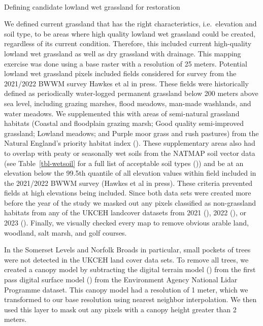 \documentclass[
  12pt,
  letterpaper,
  DIV=11,
  numbers=noendperiod]{scrartcl}
\makeatletter
\let\oldparagraph\paragraph
\renewcommand{\paragraph}{
    \@ifstar
      \xxxParagraphStar
      \xxxParagraphNoStar
  }
\newcommand{\xxxParagraphStar}[1]{\oldparagraph*{#1}\mbox{}}
\newcommand{\xxxParagraphNoStar}[1]{\oldparagraph{#1}\mbox{}}
\makeatother
\begin{document}
\paragraph{Defining candidate lowland wet grassland for
restoration}\label{defining-candidate-lowland-wet-grassland-for-restoration}

We defined current grassland that has the right characteristics,
i.e.~elevation and soil type, to be areas where high quality lowland wet
grassland could be created, regardless of its current condition.
Therefore, this included current high-quality lowland wet grassland as
well as dry grassland with drainage. This mapping exercise was done
using a base raster with a resolution of 25 meters. Potential lowland
wet grassland pixels included fields considered for survey from the
2021/2022 BWWM survey Hawkes et al in press. These fields were
historically defined as periodically water-logged permanent grassland
below 200 meters above sea level, including grazing marshes, flood
meadows, man-made washlands, and water meadows. We supplemented this
with areas of semi-natural grassland habitats (Coastal and floodplain
grazing marsh; Good quality semi-improved grassland; Lowland meadows;
and Purple moor grass and rush pastures) from the Natural England's
priority habitat index (). These supplementary areas also had to overlap with peaty or
seasonally wet soils from the NATMAP soil vector data (see
Table~\ref{tbl-wetsoil} for a full list of acceptable soil types
()) and be at an elevation below the
99.5th quantile of all elevation values within field included in the
2021/2022 BWWM survey (Hawkes et al in press). These criteria prevented
fields at high elevations being included. Since both data sets were
created more before the year of the study we masked out any pixels
classified as non-grassland habitats from any of the UKCEH landcover
datasets from 2021 (),
2022 (), or 2023
(). Finally, we visually
checked every map to remove obvious arable land, woodland, salt marsh,
and golf courses.

In the Somerset Levels and Norfolk Broads in particular, small pockets
of trees were not detected in the UKCEH land cover data sets. To remove
all trees, we created a canopy model by subtracting the digital terrain
model () from the
first pass digital surface model
() from the
Environment Agency National Lidar Programme dataset. This canopy model
had a resolution of 1 meter, which we transformed to our base resolution
using nearest neighbor interpolation. We then used this layer to mask
out any pixels with a canopy height greater than 2 meters.
\end{document}
